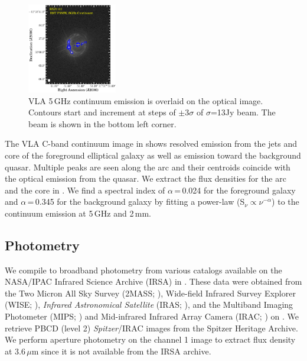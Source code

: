 \documentclass[]{emulateapj}
\begin{document}
\begin{figure}[!htbp]
\centering
\includegraphics[width=0.35\textwidth]{../Figures/F555W_ContVLA.eps}
\caption{
VLA 5\,GHz continuum emission is overlaid on the optical image. Contours start and increment at steps of $\pm$3$\sigma$ of $\sigma$=13\micron Jy beam\pmOne. The beam is shown in the bottom left corner.
 \label{fig:vla}}
\end{figure}

The VLA C-band continuum image in  shows resolved emission from the
jets and core of the foreground elliptical galaxy
as well as emission toward the background quasar.
Multiple peaks are seen along the arc and their centroids
coincide with the optical emission from the quasar.
We extract the flux densities for the arc and the core in .
We find a spectral index of $\alpha$\,=\,0.024 for the foreground
galaxy and $\alpha$\,=\,0.345 for the background galaxy by fitting a
power-law (S$_\nu \propto \nu^{-\alpha}$) to the continuum emission at
5\,GHz and 2\,mm.


\subsection{Photometry} \label{sec:photometry} %
We compile \mir to \fir broadband photometry from various
catalogs available on the NASA/IPAC Infrared Science
Archive (IRSA) in . These data were obtained from
the Two Micron All Sky Survey (2MASS; \citealt{Skrutskie06a}),
Wide-field Infrared Survey Explorer (WISE; \citealt{Wright10a}),
{\it Infrared Astronomical Satellite} (IRAS; \citealt{Neugebauer84a}), and
the Multiband Imaging Photometer (MIPS; \citealt{Rieke04a}) and
Mid-infrared Infrared Array Camera (IRAC; \citealt{Fazio04a}) on
\spitzer. We retrieve PBCD (level 2) {\it Spitzer}/IRAC images from the
Spitzer Heritage Archive. We perform aperture photometry on
the channel 1 image to extract flux density at 3.6\,$\mu$m
since it is not available from the IRSA archive.
\end{document}
